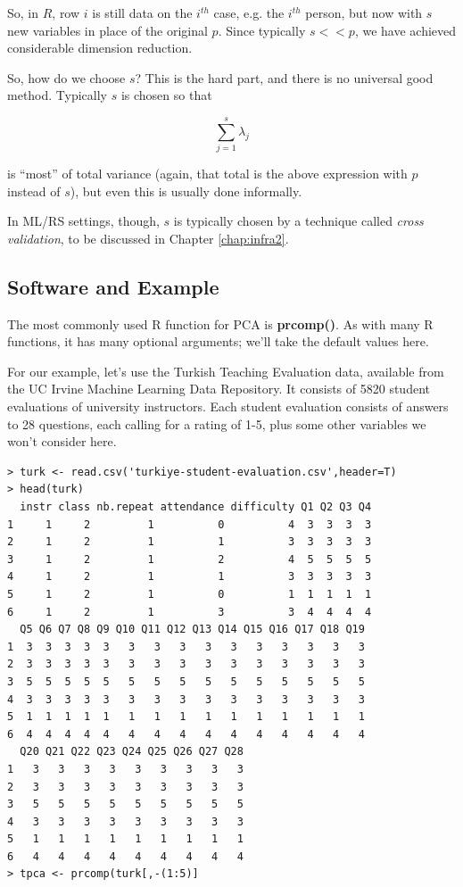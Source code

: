 So, in $R$, row $i$ is still data on the $i^{th}$ case, e.g. the $i^{th}$ 
person, but now with $s$ new variables in place of the original $p$.
Since typically $s << p$, we have achieved considerable dimension
reduction.

So, how do we choose $s$?  This is the hard part, and there is no 
universal good method.  Typically $s$ is chosen so that 

\begin{equation}
\sum_{j=1}^s \lambda_j
\end{equation}

is ``most'' of total variance (again, that total is the above expression
with $p$ instead of $s$), but even this is usually done informally.

In ML/RS settings, though, $s$ is typically chosen by a technique called
\textit{cross validation}, to be discussed in Chapter \ref{chap:infra2}.

\subsection{Software and Example}

The most commonly used R function for PCA is \textbf{prcomp()}.  As with
many R functions, it has many optional arguments; we'll take the default
values here.

For our example, let's use the Turkish Teaching Evaluation data,
available from the UC Irvine Machine Learning Data Repository.  It
consists of 5820 student evaluations of university instructors.  Each
student evaluation consists of answers to 28 questions, each calling for
a rating of 1-5, plus some other variables we won't consider here.

\begin{lstlisting}
> turk <- read.csv('turkiye-student-evaluation.csv',header=T)
> head(turk)
  instr class nb.repeat attendance difficulty Q1 Q2 Q3 Q4
1     1     2         1          0          4  3  3  3  3
2     1     2         1          1          3  3  3  3  3
3     1     2         1          2          4  5  5  5  5
4     1     2         1          1          3  3  3  3  3
5     1     2         1          0          1  1  1  1  1
6     1     2         1          3          3  4  4  4  4
  Q5 Q6 Q7 Q8 Q9 Q10 Q11 Q12 Q13 Q14 Q15 Q16 Q17 Q18 Q19
1  3  3  3  3  3   3   3   3   3   3   3   3   3   3   3
2  3  3  3  3  3   3   3   3   3   3   3   3   3   3   3
3  5  5  5  5  5   5   5   5   5   5   5   5   5   5   5
4  3  3  3  3  3   3   3   3   3   3   3   3   3   3   3
5  1  1  1  1  1   1   1   1   1   1   1   1   1   1   1
6  4  4  4  4  4   4   4   4   4   4   4   4   4   4   4
  Q20 Q21 Q22 Q23 Q24 Q25 Q26 Q27 Q28
1   3   3   3   3   3   3   3   3   3
2   3   3   3   3   3   3   3   3   3
3   5   5   5   5   5   5   5   5   5
4   3   3   3   3   3   3   3   3   3
5   1   1   1   1   1   1   1   1   1
6   4   4   4   4   4   4   4   4   4
> tpca <- prcomp(turk[,-(1:5)]
\end{lstlisting}

